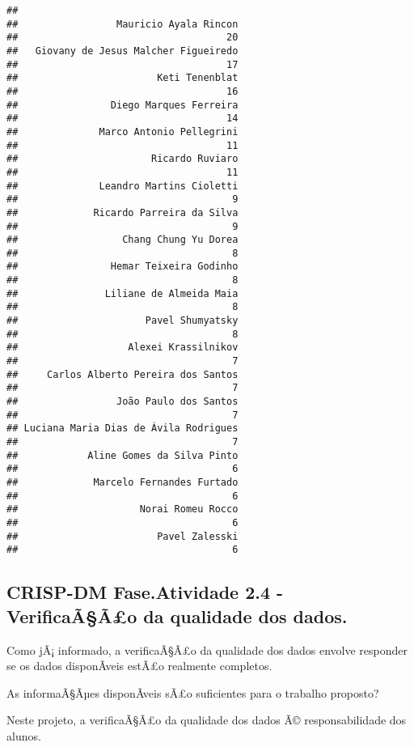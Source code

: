 \documentclass[]{article}
\begin{document}
\begin{verbatim}
## 
##                 Mauricio Ayala Rincon 
##                                    20 
##   Giovany de Jesus Malcher Figueiredo 
##                                    17 
##                        Keti Tenenblat 
##                                    16 
##                Diego Marques Ferreira 
##                                    14 
##              Marco Antonio Pellegrini 
##                                    11 
##                       Ricardo Ruviaro 
##                                    11 
##              Leandro Martins Cioletti 
##                                     9 
##             Ricardo Parreira da Silva 
##                                     9 
##                  Chang Chung Yu Dorea 
##                                     8 
##                Hemar Teixeira Godinho 
##                                     8 
##               Liliane de Almeida Maia 
##                                     8 
##                      Pavel Shumyatsky 
##                                     8 
##                   Alexei Krassilnikov 
##                                     7 
##     Carlos Alberto Pereira dos Santos 
##                                     7 
##                 João Paulo dos Santos 
##                                     7 
## Luciana Maria Dias de Ávila Rodrigues 
##                                     7 
##            Aline Gomes da Silva Pinto 
##                                     6 
##             Marcelo Fernandes Furtado 
##                                     6 
##                     Norai Romeu Rocco 
##                                     6 
##                        Pavel Zalesski 
##                                     6
\end{verbatim}

\subsection{CRISP-DM Fase.Atividade 2.4 - VerificaÃ§Ã£o da qualidade dos
dados.}\label{crisp-dm-fase.atividade-2.4---verificaaao-da-qualidade-dos-dados.}

Como jÃ¡ informado, a verificaÃ§Ã£o da qualidade dos dados envolve
responder se os dados disponÃ­veis estÃ£o realmente completos.

As informaÃ§Ãµes disponÃ­veis sÃ£o suficientes para o trabalho proposto?

Neste projeto, a verificaÃ§Ã£o da qualidade dos dados Ã©
responsabilidade dos alunos.
\end{document}
